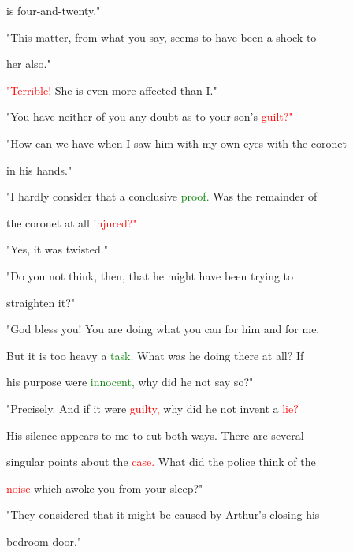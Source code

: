  is four-and-twenty."



 "This matter, from what you say, seems to have been a \textcolor{BurntOrange}{shock} to

 her also."



 \textcolor{red}{"Terrible!} She is even more affected than I."



 "You have neither of you any \textcolor{BurntOrange}{doubt} as to your son's \textcolor{red}{guilt?"}



 "How can we have when I saw him with my own eyes with the coronet

 in his hands."



 "I hardly consider that a conclusive \textcolor{green}{proof.} Was the remainder of

 the coronet at all \textcolor{red}{injured?"}



 "Yes, it was twisted."



 "Do you not think, then, that he might have been trying to

 straighten it?"



 \textcolor{BurntOrange}{"God} \textcolor{BurntOrange}{bless} you! You are doing what you can for him and for me.

 But it is too heavy a \textcolor{green}{task.} What was he doing there at all? If

 his purpose were \textcolor{green}{innocent,} why did he not say so?"



 "Precisely. And if it were \textcolor{red}{guilty,} why did he not invent a \textcolor{red}{lie?}

 His silence appears to me to cut both ways. There are several

 singular points about the \textcolor{red}{case.} What did the \textcolor{BurntOrange}{police} think of the

 \textcolor{red}{noise} which awoke you from your sleep?"



 "They considered that it might be caused by Arthur's closing his

 bedroom door."



